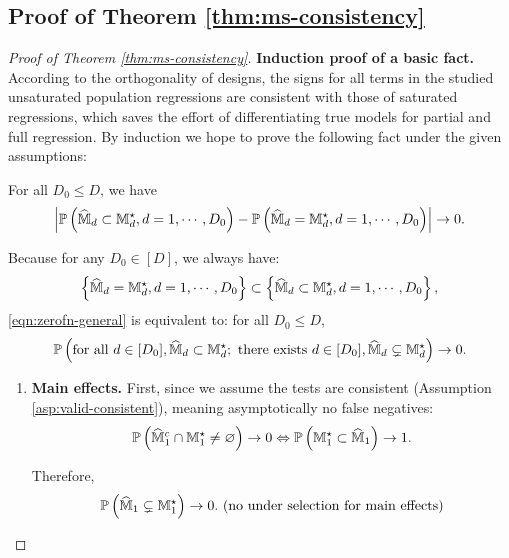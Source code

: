 \documentclass[12pt]{article}
\begin{document}
\subsection{Proof of Theorem \ref{thm:ms-consistency}}
{
\begin{proof}[Proof of Theorem \ref{thm:ms-consistency}]
\textbf{Induction proof of a basic fact.} According to the orthogonality of designs, the signs for all terms in the studied unsaturated population regressions are consistent with those of saturated regressions, which saves the effort of differentiating true models for partial and full regression. By induction we hope to prove the following fact under the given assumptions:


\begin{displayquote}
For all $D_0\le D$, we have 
\begin{align}\label{eqn:zerofn-general}
\left|{\mathbb{P}}\left(\widehat{{\mathbb{M}}}_d\subset{\mathbb{M}}^\star_d, d=1,\cdots,D_0\right)-{\mathbb{P}}\left(\widehat{{\mathbb{M}}}_d={\mathbb{M}}^\star_d, d=1,\cdots,D_0\right)\right|\to 0.
\end{align} 
\end{displayquote}

Because for any $D_0\in[D]$, we always have:
$$\left\{\widehat{{\mathbb{M}}}_d={\mathbb{M}}^\star_d, d=1,\cdots,D_0\right\}\subset\left\{\widehat{{\mathbb{M}}}_d\subset{\mathbb{M}}^\star_d, d=1,\cdots,D_0\right\},$$ 
\eqref{eqn:zerofn-general} is equivalent to: for all $D_0\le D$,
\begin{align}\label{eqn:zerofn-general-1}
{\mathbb{P}}\left(\text{for all } d\in[D_0],\widehat{{\mathbb{M}}}_d\subset{\mathbb{M}}^\star_d; \text{ there exists } d\in[D_0], \widehat{{\mathbb{M}}}_d\subsetneq{\mathbb{M}}^\star_d\right)\to 0.
\end{align} 


\begin{enumerate}
    \item \textbf{Main effects.}
    First, since we assume the tests are consistent (Assumption \ref{asp:valid-consistent}), meaning asymptotically no false negatives:
    \begin{align*}
        {\mathbb{P}}\left({\widehat{{\mathbb{M}}}_1}^c \cap{\mathbb{M}}^\star_1\neq \varnothing\right)\to 0 \Leftrightarrow {\mathbb{P}}\left({\mathbb{M}}^\star_1\subset{\widehat{{\mathbb{M}}}_1}\right)\to 1.
    \end{align*}
     
    Therefore,
    \begin{align}\label{eqn:zerofn-general-2}
      {\mathbb{P}}\left(\widehat{{\mathbb{M}}}_1\subsetneq{\mathbb{M}}^\star_1\right)\to 0. \text{ (no under selection for main effects)}
    \end{align} 
    

\end{enumerate}
\end{proof}}
\end{document}
